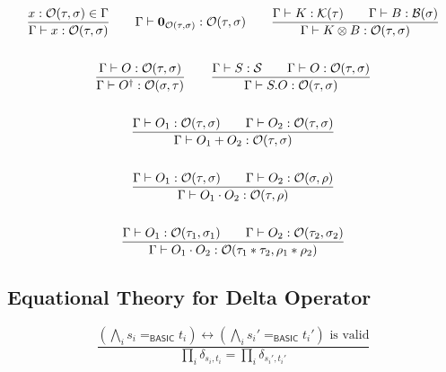 \begin{definition}
\begin{gather*}
  \frac{x : \mathcal{O}(\tau, \sigma) \in \Gamma}{\Gamma \vdash x : \mathcal{O}(\tau, \sigma)}
  \qquad
  \Gamma \vdash \mathbf{0}_{\mathcal{O}(\tau, \sigma)} : \mathcal{O}(\tau, \sigma) 
  \qquad
  \frac{\Gamma \vdash K : \mathcal{K}(\tau) \qquad \Gamma \vdash B : \mathcal{B}(\sigma)}{\Gamma \vdash K \otimes B : \mathcal{O}(\tau, \sigma)} \\
  \\
  \frac{\Gamma \vdash O : \mathcal{O}(\tau, \sigma)}{\Gamma \vdash O^\dagger : \mathcal{O}(\sigma, \tau)}
  \qquad
  \frac{\Gamma \vdash S : \mathcal{S} \qquad \Gamma \vdash O : \mathcal{O}(\tau, \sigma)}{\Gamma \vdash S.O : \mathcal{O}(\tau, \sigma)} \\
  \\
  \frac{\Gamma \vdash O_1 : \mathcal{O}(\tau, \sigma) \qquad \Gamma \vdash O_2 : \mathcal{O}(\tau, \sigma)}{\Gamma \vdash O_1 + O_2 : \mathcal{O}(\tau, \sigma)} \\
  \\
  \frac{\Gamma \vdash O_1 : \mathcal{O}(\tau, \sigma) \qquad \Gamma \vdash O_2 : \mathcal{O}(\sigma, \rho)}{\Gamma \vdash O_1 \cdot O_2 : \mathcal{O}(\tau, \rho)} \\
  \\
  \frac{\Gamma \vdash O_1 : \mathcal{O}(\tau_1, \sigma_1) \qquad \Gamma \vdash O_2 : \mathcal{O}(\tau_2, \sigma_2)}{\Gamma \vdash O_1 \cdot O_2 : \mathcal{O}(\tau_1 * \tau_2, \rho_1 * \rho_2)}
\end{gather*}




\end{definition}


\subsection{Equational Theory for Delta Operator}

$$
  \frac{(\bigwedge_i s_i =_\textsf{BASIC} t_i) \leftrightarrow (\bigwedge_i s_i' =_\textsf{BASIC} t_i') \textrm{ is valid}}{\prod_i \delta_{s_i, t_i} = \prod_i \delta_{s_i', t_i'}}
$$

